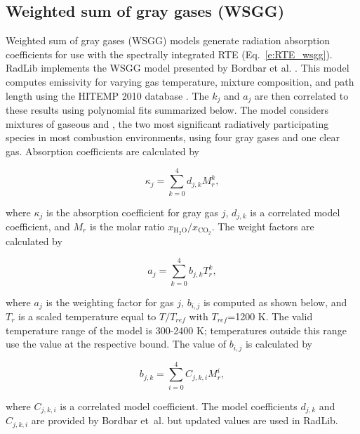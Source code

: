 \documentclass[preprint,12pt]{elsarticle}
\begin{document}
%


\subsection{Weighted sum of gray gases (WSGG)} \label{s:wsgg}

Weighted sum of gray gases (WSGG) models generate radiation absorption coefficients for use with the spectrally integrated RTE (Eq.~\ref{e:RTE_wsgg}).
RadLib implements the WSGG model presented by Bordbar et al. \citep{Bordbar_2014,Bordbar_2020}. This model computes emissivity for varying gas temperature, mixture composition, and path length using the HITEMP 2010 database \cite{Rothman_2010}. The $k_j$ and $a_j$ are then correlated to these results using polynomial fits summarized below. The model considers mixtures of gaseous  and , the two most significant radiatively participating species in most combustion environments, using four gray gases and one clear gas. Absorption coefficients are calculated by 
%
\begin{linenomath}
\begin{equation}
    \kappa_j=\sum_{k=0}^{4}d_{j,k}M_r^k,
\end{equation}
\end{linenomath}
%
where $\kappa_j$ is the absorption coefficient for gray gas $j$, $d_{j,k}$ is a correlated model coefficient, and $M_r$ is the molar ratio $x_{\mathrm{H_2O}}/x_{\mathrm{CO_2}}$. The weight factors are calculated by 
%
\begin{linenomath}
\begin{equation}
    a_j=\sum_{k=0}^{4}b_{j,k}T_r^k,
\end{equation}
\end{linenomath}
%
where $a_j$ is the weighting factor for gas $j$, $b_{i,j}$ is computed as shown below,  and $T_r$ is a scaled temperature equal to $T/T_{ref}$ with $T_{ref}$=1200 K. The valid temperature range of the model is 300-2400 K; temperatures outside this range use the value at the respective bound. The value of $b_{i,j}$ is calculated by 
%
\begin{linenomath}
\begin{equation}
 b_{j,k}=\sum_{i=0}^{4}C_{j,k,i}M_r^i,
\end{equation}
\end{linenomath}
%
where $C_{j,k,i}$ is a correlated model coefficient. The model coefficients $d_{j,k}$ and $C_{j,k,i}$ are provided by Bordbar et~al. \citep{Bordbar_2014,Bordbar_2020} but updated values are used in RadLib. 
\end{document}
